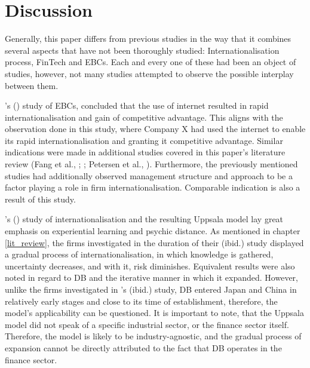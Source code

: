 \documentclass[11pt,a4paper]{article}
\begin{document}
{{{	
\newpage

\section{Discussion}
\vspace{-2mm}
\label{discussion}
\frenchspacing
{} \par %
Generally, this paper differs from previous studies in the way that it combines several aspects that have not been thoroughly studied: Internationalisation process, FinTech and EBCs. Each and every one of these had been an object of studies, however, not many studies attempted to observe the possible interplay between them. \par
\citeauthor{loaneCrossnationalComparisonInternationalisation2002}'s (\citeyear{loaneCrossnationalComparisonInternationalisation2002}) study of EBCs, concluded that the use of internet resulted in rapid internationalisation and gain of competitive advantage. This aligns with the observation done in this study, where Company X had used the internet to enable its rapid internationalisation and granting it competitive advantage. Similar indications were made in additional studies covered in this paper's literature review (Fang et al., \citeyear{fangParachutingInternationalizationStudy2017}; \cite{terziImpactEcommerceInternational2011}; Petersen et al., \citeyear{petersenInternetForeignMarket2002}). Furthermore, the previously mentioned studies had additionally observed management structure and approach to be a factor playing a role in firm internationalisation. Comparable indication is also a result of this study.  \par
\citeauthor{johansonInternationalizationProcessFirm1977}'s (\citeyear{johansonInternationalizationProcessFirm1977}) study of internationalisation and the resulting Uppsala model lay great emphasis on experiential learning and psychic distance. As mentioned in chapter \ref{lit_review}, the firms investigated in the duration of their (ibid.) study displayed a gradual process of internationalisation, in which knowledge is gathered, uncertainty decreases, and with it, risk diminishes. Equivalent results were also noted in regard to DB and the iterative manner in which it expanded. However, unlike the firms investigated in \citeauthor{johansonInternationalizationProcessFirm1977}'s (ibid.) study, DB entered Japan and China in relatively early stages and close to its time of establishment, therefore, the model's applicability can be questioned. It is important to note, that the Uppsala model did not speak of a specific industrial sector, or the finance sector itself. Therefore, the model is likely to be industry-agnostic, and the gradual process of expansion cannot be directly attributed to the fact that DB operates in the finance sector. \par
}}}
\end{document}
